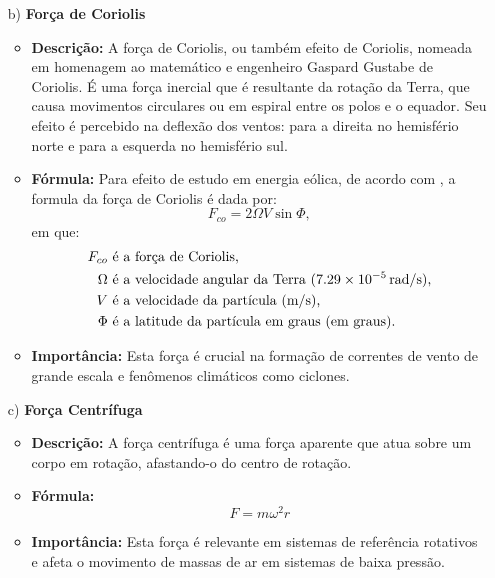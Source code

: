 \begin{itemize}
    \item[b)] \textbf{Força de Coriolis}
    \begin{itemize}
        \item \textbf{Descrição:} A força de Coriolis, ou também efeito de Coriolis, nomeada em homenagem ao matemático e engenheiro Gaspard Gustabe de Coriolis. É uma força inercial que é resultante da rotação da Terra, que causa movimentos circulares ou em espiral entre os polos e o equador. Seu efeito é percebido na deflexão dos ventos: para a direita no hemisfério norte e para a esquerda no hemisfério sul.
        \item \textbf{Fórmula:} Para efeito de estudo em energia eólica, de acordo com , a formula da força de Coriolis é dada por:
            \begin{equation}
                F_{co} = 2\Omega V \sin{\Phi},
                \label{eq:placeholder_label}
            \end{equation}
            em que:
            \begin{align*}
                F_{co} & \text{ é a força de Coriolis,} \\
                \Omega & \text{ é a velocidade angular da Terra \( (7.29 \times 10^{-5} \, \text{rad/s}) \),} \\
                V & \text{ é a velocidade da partícula \( (\text{m/s}) \),} \\
                \Phi & \text{ é a latitude da partícula em graus \( (\text{em graus}) \).}
            \end{align*}
        \item \textbf{Importância:} Esta força é crucial na formação de correntes de vento de grande escala e fenômenos climáticos como ciclones.
    \end{itemize}
    
    \item[c)] \textbf{Força Centrífuga}
    \begin{itemize}
        \item \textbf{Descrição:} A força centrífuga é uma força aparente que atua sobre um corpo em rotação, afastando-o do centro de rotação.
        \item \textbf{Fórmula:} 
            \begin{equation}
                F = m \omega^2 r
                \label{eq:placeholder}
            \end{equation}
        \item \textbf{Importância:} Esta força é relevante em sistemas de referência rotativos e afeta o movimento de massas de ar em sistemas de baixa pressão.
    \end{itemize}
    

\end{itemize}
